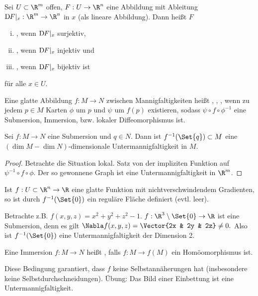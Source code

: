 \begin{df} \label{2.4}
    Sei $U \subset \R^m$ offen, $F: U \to \R^n$ eine Abbildung mit Ableitung $\Df[F]|_{x}: \R^m \to \R^n$ in $x$ (als lineare Abbildung).
    Dann heißt $F$
    \begin{enumerate}[i)]
        \item
            , wenn $\Df[F]|_{x}$ surjektiv,
        \item
            , wenn $\Df[F]|_{x}$ injektiv und
        \item
            , wenn $\Df[F]|_{x}$ bijektiv ist
    \end{enumerate}
    für alle $x \in U$.

    Eine glatte Abbildung $f: M \to N$ zwischen Mannigfaltigkeiten heißt , , , wenn zu jedem $p \in M$ Karten $\phi$ um $p$ und $\psi$ um $f(p)$ existieren, sodass $\psi \circ f \circ \phi^{-1}$ eine Submersion, Immersion, bzw. lokaler Diffeomorphismus ist.
\end{df}

\begin{st} \label{2.5}
    Sei $f: M \to N$ eine Submersion und $q \in N$.
    Dann ist $f^{-1}(\Set{q}) \subset M$ eine $(\dim M - \dim N)$-dimensionale Untermannigfaltigkeit in $M$.
    \begin{proof}
        Betrachte die Situation lokal.
        Satz von der impliziten Funktion auf $\psi^{-1} \circ f \circ \phi$.
        Der so gewonnene Graph ist eine Untermannigfaltigkeit in $\R^m$.
    \end{proof}
\end{st}

\begin{ex*}
    Ist $f: U \subset \R^n \to \R$ eine glatte Funktion mit nichtverschwindendem Gradienten, so ist durch $f^{-1}(\Set{0})$ ein reguläre Fläche definiert (evtl. leer).

    Betrachte z.B. $f(x,y,z) = x^2 + y^2 + z^2 - 1$.
    $f:\R^3 \setminus \Set{0} \to \R$ ist eine Submersion,
    denn es gilt
    \begin{math}
        \Nabla f(x,y,z) = \Vector{2x & 2y & 2z} \neq 0.
    \end{math}
    Also ist $f^{-1}(\Set{0})$ eine Untermannigfaltigkeit der Dimension 2.
\end{ex*}

\begin{df} \label{2.6}
    Eine Immersion $f:M \to N$ heißt , falls $f: M \to f(M)$ ein Homöomorphismus ist.
    \begin{note}
        Diese Bedingung garantiert, dass $f$ keine Selbstannäherungen hat (insbesondere keine Selbstdurchschneidungen).
        Übung: Das Bild einer Einbettung ist eine Untermannigfaltigkeit.
    \end{note}
\end{df}

